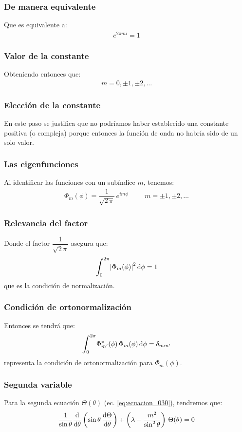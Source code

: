 \documentclass[12pt]{beamer}
\begin{document}
\begin{frame}
\frametitle{De manera equivalente}
Que es equivalente a:
\pause
\begin{align*}
e^{2 \pi m i} = 1
\end{align*}
\end{frame}
\begin{frame}
\frametitle{Valor de la constante}
Obteniendo entonces que:
\pause
\begin{align*}
m = 0, \pm 1, \pm 2, \ldots
\end{align*}
\end{frame}
\begin{frame}
\frametitle{Elección de la constante}
En este paso se justifica que no podríamos haber establecido una constante positiva (o compleja) porque entonces la función de onda no habría sido de un solo valor.
\end{frame}
\begin{frame}
\frametitle{Las eigenfunciones}
Al identificar las funciones con un subíndice $m$, tenemos:
\pause
\begin{align}
\Phi_{m}(\phi) = \dfrac{1}{\sqrt{2 \, \pi}} \, e^{i m \phi} \hspace{1cm} m = \pm 1, \pm 2, \ldots
\label{eq:ecuacion_032}
\end{align}
\end{frame}
\begin{frame}
\frametitle{Relevancia del factor}
Donde el factor $\dfrac{1}{\sqrt{2 \, \pi}}$ asegura que:
\pause
\begin{align*}
\scaleint{6ex}_{\bs 0}^{2 \pi} \abs{\Phi_{m}(\phi)}^{2} \dd{\phi} = 1
\end{align*}
que es la condición de normalización.
\end{frame}
\begin{frame}
\frametitle{Condición de ortonormalización}
Entonces se tendrá que:
\pause
\begin{align}
\scaleint{6ex}_{\bs 0}^{2 \pi} \Phi_{\ptilde{m}}^{*}(\phi) \, \Phi_{m}(\phi) \dd{\phi} = \delta_{m \ptilde{m}}
\label{eq:ecuacion_033}
\end{align}
representa la condición de ortonormalización para $\Phi_{m}(\phi)$.
\end{frame}
\begin{frame}
\frametitle{Segunda variable}
Para la segunda ecuación $\Theta (\theta)$ (ec. \ref{eq:ecuacion_030}), tendremos que:
\pause
\begin{align}
\dfrac{1}{\sin \theta} \dv{\theta} \left( \sin \theta \, \dv{\Theta}{\theta} \right) + \left( \lambda - \dfrac{m^{2}}{\sin^{2} \theta} \right) \, \Theta (\theta) = 0
\label{eq:ecuacion_034}
\end{align}
\end{frame}
\end{document}
